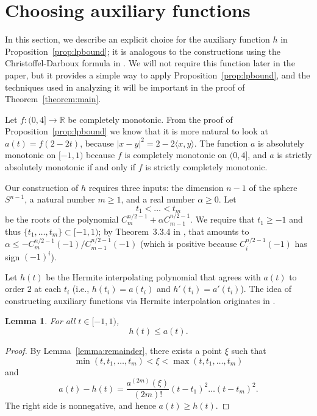 \documentclass{jams-l}
\theoremstyle{plain}
\newtheorem{lemma}[theorem]{Lemma}
\numberwithin{theorem}{section}
\theoremstyle{definition}
\numberwithin{equation}{section}
\newcommand{\R}{{\mathbb R}}
\newcommand{\co}{\colon}
\begin{document}
\section{Choosing auxiliary functions}
\label{sec:aux}

In this section, we describe an explicit choice for the auxiliary
function $h$ in Proposition~\ref{prop:lpbound};  it is analogous
to the constructions using the Christoffel-Darboux formula in
\cite{KL,MRRW}.  We will not require this function later in the
paper, but it provides a simple way to apply
Proposition~\ref{prop:lpbound}, and the techniques used in
analyzing it will be important in the proof of
Theorem~\ref{theorem:main}.

Let $f \co (0,4] \to \R$ be completely monotonic.  From the proof
of Proposition~\ref{prop:lpbound} we know that it is more natural
to look at $a(t) = f(2-2t)$, because $|x-y|^2 = 2-2\langle x,y
\rangle$.  The function $a$ is absolutely monotonic on $[-1,1)$
because $f$ is completely monotonic on $(0,4]$, and $a$ is
strictly absolutely monotonic if and only if $f$ is strictly
completely monotonic.

Our construction of $h$ requires three inputs: the dimension $n-1$
of the sphere $S^{n-1}$, a natural number $m \ge 1$, and a real
number $\alpha \ge 0$. Let
$$
t_1 < \dots < t_m
$$
be the roots of the polynomial $C_m^{n/2-1} + \alpha
C_{m-1}^{n/2-1}$.  We require that $t_1 \ge -1$ and thus
$\{t_1,\dots,t_m\} \subset [-1,1)$; by Theorem~3.3.4 in \cite{Sz},
that amounts to $\alpha \le -C_m^{n/2-1}(-1)/C_{m-1}^{n/2-1}(-1)$
(which is positive because $C^{n/2-1}_i(-1)$ has sign $(-1)^i$).

Let $h(t)$ be the Hermite interpolating polynomial that agrees
with $a(t)$ to order $2$ at each $t_i$ (i.e., $h(t_i)=a(t_i)$ and
$h'(t_i)=a'(t_i)$).  The idea of constructing auxiliary functions
via Hermite interpolation originates in \cite{Y}.

\begin{lemma} \label{lemma:upperbound1}
For all $t \in [-1,1)$,
$$
h(t) \le a(t).
$$
\end{lemma}

\begin{proof}
By Lemma~\ref{lemma:remainder}, there exists a point $\xi$ such
that
$$
\min(t,t_1,\dots,t_m) < \xi < \max(t,t_1,\dots,t_m)
$$
and
$$
a(t) - h(t) = \frac{a^{(2m)}(\xi)}{(2m)!}(t-t_1)^{2}\dots
(t-t_m)^{2}.
$$
The right side is nonnegative, and hence $a(t) \ge h(t)$.
\end{proof}
\end{document}
